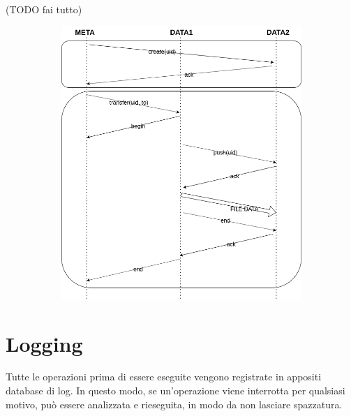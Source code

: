 \documentclass{article}
\begin{document}
(TODO fai tutto)


\begin{figure}[H]
	\centering
	\begin{subfigure}{0.80\linewidth}
		\includegraphics[width=\linewidth]{../diagrams/requests/transfer_request.png}
	\end{subfigure}
\end{figure}




\section{Logging}

Tutte le operazioni prima di essere eseguite vengono registrate in appositi database di log. In questo modo, se un'operazione viene interrotta per qualsiasi motivo, può essere analizzata e rieseguita, in modo da non lasciare spazzatura. 





\end{document}
